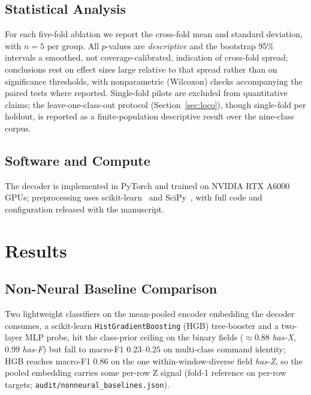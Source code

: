 \documentclass[conference]{IEEEtran}
\begin{document}
\subsection{Statistical Analysis}
\label{sec:stats}

For each five-fold ablation we report the cross-fold mean and standard deviation, with $n=5$ per group. All $p$-values are \emph{descriptive} and the bootstrap 95\% intervals a smoothed, not coverage-calibrated, indication of cross-fold spread; conclusions rest on effect sizes large relative to that spread rather than on significance thresholds, with nonparametric (Wilcoxon) checks accompanying the paired tests where reported. Single-fold pilots are excluded from quantitative claims; the leave-one-class-out protocol (Section~\ref{sec:loco}), though single-fold per holdout, is reported as a finite-population descriptive result over the nine-class corpus.

\subsection{Software and Compute}
\label{sec:software}

The decoder is implemented in PyTorch and trained on NVIDIA RTX A6000 GPUs; preprocessing uses scikit-learn~\cite{pedregosa2011sklearn} and SciPy~\cite{virtanen2020scipy}, with full code and configuration released with the manuscript.

\section{Results}
\label{sec:experiments}

\subsection{Non-Neural Baseline Comparison}
\label{sec:results-baseline}

Two lightweight classifiers on the mean-pooled encoder embedding the decoder consumes, a scikit-learn \texttt{HistGradientBoosting} (HGB) tree-booster and a two-layer MLP probe, hit the class-prior ceiling on the binary fields ($\approx\!0.88$ \emph{has-X}, $0.99$ \emph{has-F}) but fall to macro-F1 $0.23$--$0.25$ on multi-class command identity; HGB reaches macro-F1 $0.86$ on the one within-window-diverse field \emph{has-Z}, so the pooled embedding carries some per-row Z signal (fold-1 reference on per-row targets; \texttt{audit/nonneural\_baselines.json}).
\end{document}
